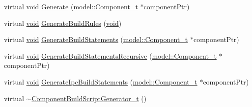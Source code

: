 \begin{DoxyCompactItemize}
\item 
virtual \hyperlink{_t_e_m_p_l_a_t_e__cdef_8h_ac9c84fa68bbad002983e35ce3663c686}{void} \hyperlink{classninja_1_1_component_build_script_generator__t_a7355924bfc823d3eb365c4f5fded56c1}{Generate} (\hyperlink{structmodel_1_1_component__t}{model\+::\+Component\+\_\+t} $\ast$component\+Ptr)
\item 
virtual \hyperlink{_t_e_m_p_l_a_t_e__cdef_8h_ac9c84fa68bbad002983e35ce3663c686}{void} \hyperlink{classninja_1_1_component_build_script_generator__t_a919cf9299a48f6f1b1310dfa4ba6358f}{Generate\+Build\+Rules} (\hyperlink{_t_e_m_p_l_a_t_e__cdef_8h_ac9c84fa68bbad002983e35ce3663c686}{void})
\item 
virtual \hyperlink{_t_e_m_p_l_a_t_e__cdef_8h_ac9c84fa68bbad002983e35ce3663c686}{void} \hyperlink{classninja_1_1_component_build_script_generator__t_a7b66b6120d499cf2a8962ce4aed6d956}{Generate\+Build\+Statements} (\hyperlink{structmodel_1_1_component__t}{model\+::\+Component\+\_\+t} $\ast$component\+Ptr)
\item 
virtual \hyperlink{_t_e_m_p_l_a_t_e__cdef_8h_ac9c84fa68bbad002983e35ce3663c686}{void} \hyperlink{classninja_1_1_component_build_script_generator__t_af567db3b66948c3524a0a3e90e6e681b}{Generate\+Build\+Statements\+Recursive} (\hyperlink{structmodel_1_1_component__t}{model\+::\+Component\+\_\+t} $\ast$component\+Ptr)
\item 
virtual \hyperlink{_t_e_m_p_l_a_t_e__cdef_8h_ac9c84fa68bbad002983e35ce3663c686}{void} \hyperlink{classninja_1_1_component_build_script_generator__t_a8be899aae9719dcec03fd9e7aa26fcdd}{Generate\+Ipc\+Build\+Statements} (\hyperlink{structmodel_1_1_component__t}{model\+::\+Component\+\_\+t} $\ast$component\+Ptr)
\item 
virtual \hyperlink{classninja_1_1_component_build_script_generator__t_a2c6736b281522b1b0e7bb7ee8f326d04}{$\sim$\+Component\+Build\+Script\+Generator\+\_\+t} ()
\end{DoxyCompactItemize}
